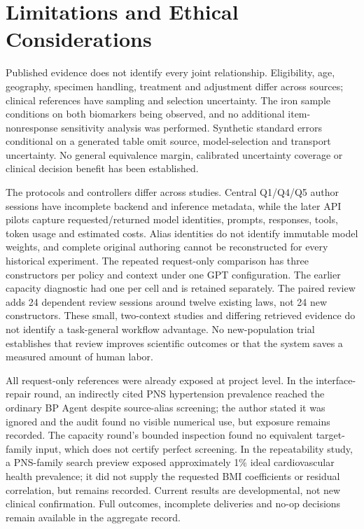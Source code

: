 \documentclass[11pt,letterpaper]{article}
\begin{document}
\section{Limitations and Ethical Considerations}

Published evidence does not identify every joint relationship. Eligibility, age, geography, specimen handling, treatment and adjustment differ across sources; clinical references have sampling and selection uncertainty. The iron sample conditions on both biomarkers being observed, and no additional item-nonresponse sensitivity analysis was performed. Synthetic standard errors conditional on a generated table omit source, model-selection and transport uncertainty. No general equivalence margin, calibrated uncertainty coverage or clinical decision benefit has been established.


The protocols and controllers differ across studies. Central Q1/\allowbreak{}Q4/\allowbreak{}Q5 author sessions have incomplete backend and inference metadata, while the later API pilots capture requested/\allowbreak{}returned model identities, prompts, responses, tools, token usage and estimated costs. Alias identities do not identify immutable model weights, and complete original authoring cannot be reconstructed for every historical experiment. The repeated request-only comparison has three constructors per policy and context under one GPT configuration. The earlier capacity diagnostic had one per cell and is retained separately. The paired review adds 24 dependent review sessions around twelve existing laws, not 24 new constructors. These small, two-context studies and differing retrieved evidence do not identify a task-general workflow advantage. No new-population trial establishes that review improves scientific outcomes or that the system saves a measured amount of human labor.


All request-only references were already exposed at project level. In the interface-repair round, an indirectly cited PNS hypertension prevalence reached the ordinary BP Agent despite source-alias screening; the author stated it was ignored and the audit found no visible numerical use, but exposure remains recorded. The capacity round's bounded inspection found no equivalent target-family input, which does not certify perfect screening. In the repeatability study, a PNS-family search preview exposed approximately 1\% ideal cardiovascular health prevalence; it did not supply the requested BMI coefficients or residual correlation, but remains recorded. Current results are developmental, not new clinical confirmation. Full outcomes, incomplete deliveries and no-op decisions remain available in the aggregate record.
\end{document}

